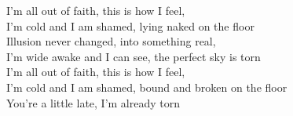 I'm all out of faith, this is how I feel, \\
I'm cold and I am shamed, lying naked on the floor \\
Illusion never changed, into something real, \\
I'm wide awake and I can see, the perfect sky is torn \\
I'm all out of faith, this is how I feel, \\
I'm cold and I am shamed, bound and broken on the floor \\
You're a little late, I'm already torn \\


